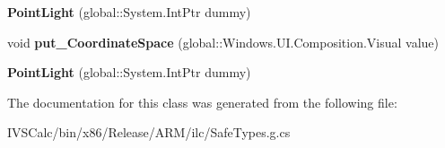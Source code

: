 \begin{DoxyCompactItemize}
\item 
\mbox{\label{class_windows_1_1_u_i_1_1_composition_1_1_point_light_a4425a63d22bb7ff47b521163622a2a48}} 
{\bfseries Point\+Light} (global\+::\+System.\+Int\+Ptr dummy)
\item 
\mbox{\label{class_windows_1_1_u_i_1_1_composition_1_1_point_light_a1aada357d8eb2730b51c0178fdd8d371}} 
void {\bfseries put\+\_\+\+Coordinate\+Space} (global\+::\+Windows.\+U\+I.\+Composition.\+Visual value)
\item 
\mbox{\label{class_windows_1_1_u_i_1_1_composition_1_1_point_light_a4425a63d22bb7ff47b521163622a2a48}} 
{\bfseries Point\+Light} (global\+::\+System.\+Int\+Ptr dummy)
\end{DoxyCompactItemize}


The documentation for this class was generated from the following file\+:\begin{DoxyCompactItemize}
\item 
I\+V\+S\+Calc/bin/x86/\+Release/\+A\+R\+M/ilc/Safe\+Types.\+g.\+cs\end{DoxyCompactItemize}
